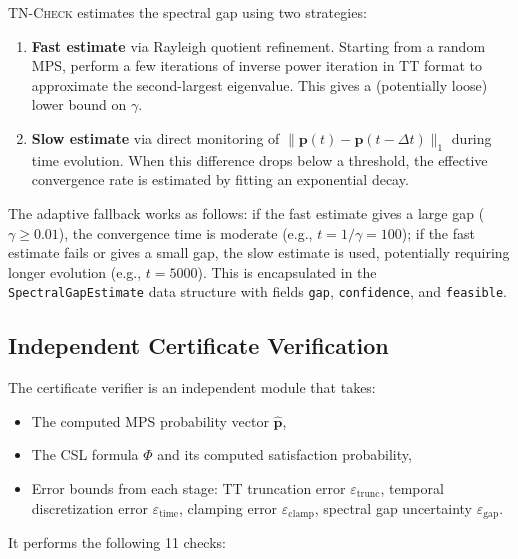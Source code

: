 \documentclass[11pt]{article}
\newcommand{\tncheck}{\textsc{TN-Check}}
\newcommand{\norm}[1]{\lVert #1 \rVert}
\newcommand{\eps}{\varepsilon}
\begin{document}
\tncheck{} estimates the spectral gap using two strategies:

\begin{enumerate}[itemsep=2pt]
\item \textbf{Fast estimate} via Rayleigh quotient refinement.
  Starting from a random MPS, perform a few iterations of
  inverse power iteration in TT format to approximate the
  second-largest eigenvalue.
  This gives a (potentially loose) lower bound on $\gamma$.

\item \textbf{Slow estimate} via direct monitoring of
  $\norm{\mathbf{p}(t) - \mathbf{p}(t-\Delta t)}_1$ during time evolution.
  When this difference drops below a threshold, the effective
  convergence rate is estimated by fitting an exponential decay.
\end{enumerate}

The adaptive fallback works as follows:
if the fast estimate gives a large gap ($\gamma \geq 0.01$),
the convergence time is moderate (e.g., $t = 1/\gamma = 100$);
if the fast estimate fails or gives a small gap, the slow
estimate is used, potentially requiring longer evolution
(e.g., $t = 5000$).
This is encapsulated in the \texttt{SpectralGapEstimate} data structure
with fields \texttt{gap}, \texttt{confidence}, and \texttt{feasible}.

\subsection{Independent Certificate Verification}\label{sec:algorithms:cert}

The certificate verifier is an independent module that takes:
\begin{itemize}[itemsep=1pt]
\item The computed MPS probability vector $\hat{\mathbf{p}}$,
\item The CSL formula $\Phi$ and its computed satisfaction probability,
\item Error bounds from each stage: TT truncation error $\eps_{\mathrm{trunc}}$,
  temporal discretization error $\eps_{\mathrm{time}}$,
  clamping error $\eps_{\mathrm{clamp}}$,
  spectral gap uncertainty $\eps_{\mathrm{gap}}$.
\end{itemize}

It performs the following 11 checks:
\end{document}
